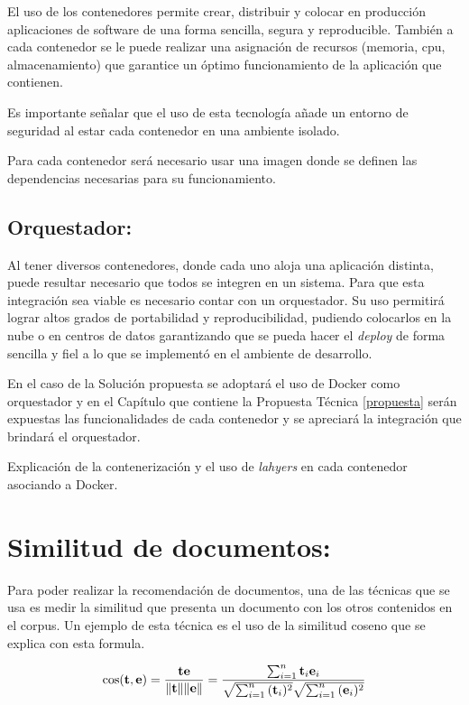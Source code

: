 \documentclass[
  10,
  openany]{book}
\begin{document}
El uso de los contenedores permite crear, distribuir y colocar en producción aplicaciones de software de una forma sencilla, segura y reproducible. También a cada contenedor se le puede realizar una asignación de recursos (memoria, cpu, almacenamiento) que garantice un óptimo funcionamiento de la aplicación que contienen.

Es importante señalar que el uso de esta tecnología añade un entorno de seguridad al estar cada contenedor en una ambiente isolado.

Para cada contenedor será necesario usar una imagen donde se definen las dependencias necesarias para su funcionamiento.

\hypertarget{orquestador}{%
\subsection{Orquestador:}\label{orquestador}}

Al tener diversos contenedores, donde cada uno aloja una aplicación distinta, puede resultar necesario que todos se integren en un sistema. Para que esta integración sea viable es necesario contar con un orquestador. Su uso permitirá lograr altos grados de portabilidad y reproducibilidad, pudiendo colocarlos en la nube o en centros de datos garantizando que se pueda hacer el \emph{deploy} de forma sencilla y fiel a lo que se implementó en el ambiente de desarrollo.

En el caso de la Solución propuesta se adoptará el uso de Docker como orquestador y en el Capítulo que contiene la Propuesta Técnica \ref{propuesta} serán expuestas las funcionalidades de cada contenedor y se apreciará la integración que brindará el orquestador.

Explicación de la contenerización y el uso de \emph{lahyers} en cada contenedor asociando a Docker.

\hypertarget{similitud}{%
\section{Similitud de documentos:}\label{similitud}}

Para poder realizar la recomendación de documentos, una de las técnicas que se usa es medir la similitud que presenta un documento con los otros contenidos en el corpus. Un ejemplo de esta técnica es el uso de la similitud coseno que se explica con esta formula.

\begin{equation}
\cos ({\bf t},{\bf e})= {{\bf t} {\bf e} \over \|{\bf t}\| \|{\bf e}\|} = \frac{ \sum_{i=1}^{n}{{\bf t}_i{\bf e}_i} }{ \sqrt{\sum_{i=1}^{n}{({\bf t}_i)^2}} \sqrt{\sum_{i=1}^{n}{({\bf e}_i)^2}} }
\end{equation}
\end{document}

